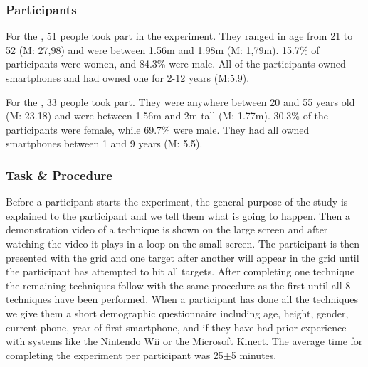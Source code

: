 \subsubsection{Participants}
For the \target, 51 people took part in the experiment. They ranged in age from 21 to 52 (M: 27,98) and were between 1.56m and 1.98m (M: 1,79m). 
15.7\% of participants were women, and 84.3\% were male.
All of the participants owned smartphones and had owned one for 2-12 years (M:5.9).

For the \accuracy, 33 people took part. They were anywhere between 20 and 55 years old (M: 23.18) and were between 1.56m and 2m tall (M: 1.77m).
30.3\% of the participants were female, while 69.7\% were male.
They had all owned smartphones between 1 and 9 years (M: 5.5).

\subsubsection{Task \& Procedure} \label{sec:procedure}
Before a participant starts the experiment, the general purpose of the study is explained to the participant and we tell them what is going to happen.
Then a demonstration video of a technique is shown on the large screen and after watching the video it plays in a loop on the small screen.
The participant is then presented with the grid and one target after another will appear in the grid until the participant has attempted to hit all targets.
After completing one technique the remaining techniques follow with the same procedure as the first until all 8 techniques have been performed.
When a participant has done all the techniques we give them a short demographic questionnaire including age, height, gender, current phone, year of first smartphone, and if they have had prior experience with systems like the Nintendo Wii or the Microsoft Kinect.
The average time for completing the experiment per participant was 25$\pm$5 minutes. 